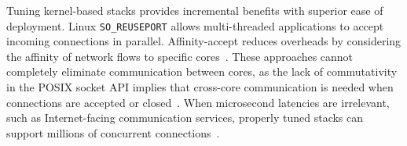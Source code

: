  Tuning kernel-based stacks provides incremental
benefits with superior ease of deployment.  Linux \texttt{SO\_REUSEPORT}
allows multi-threaded applications to accept incoming connections in
parallel. Affinity-accept reduces overheads by considering the
affinity of network flows to specific
cores~\cite{DBLP:conf/eurosys/PesterevSZM12}. These approaches cannot
completely eliminate communication between cores, as the lack of
commutativity in the POSIX socket API implies that cross-core
communication is needed when connections are accepted or
closed~\cite{DBLP:conf/sosp/ClementsKZMK13}. When microsecond
latencies are irrelevant, such as Internet-facing communication
services, properly tuned stacks can support millions of concurrent
connections~\cite{whatsapp-2mil}.
